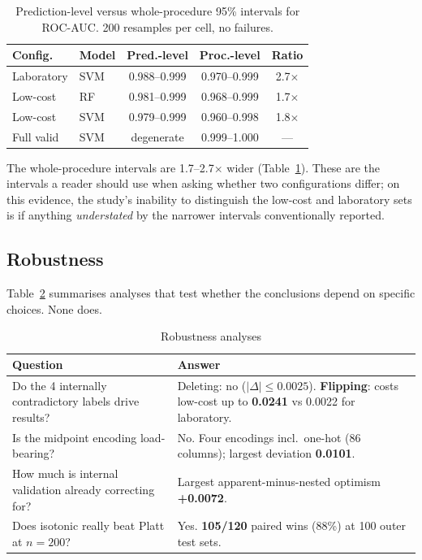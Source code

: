 \documentclass[conference]{IEEEtran}
\newcommand{\tabhead}[1]{\textbf{#1}}
\begin{document}
\begin{table}[t]
\caption{Prediction-level versus whole-procedure 95\% intervals for ROC-AUC.
200 resamples per cell, no failures.}
\label{tab:boot}
\centering
\footnotesize
\setlength{\tabcolsep}{3pt}
\begin{tabular}{llccc}
\toprule
\tabhead{Config.} & \tabhead{Model} & \tabhead{Pred.-level} &
\tabhead{Proc.-level} & \tabhead{Ratio} \\
\midrule
Laboratory & SVM & 0.988--0.999 & 0.970--0.999 & 2.7$\times$ \\
Low-cost   & RF  & 0.981--0.999 & 0.968--0.999 & 1.7$\times$ \\
Low-cost   & SVM & 0.979--0.999 & 0.960--0.998 & 1.8$\times$ \\
Full valid & SVM & degenerate   & 0.999--1.000 & --- \\
\bottomrule
\end{tabular}
\end{table}

The whole-procedure intervals are 1.7--2.7$\times$ wider (Table~\ref{tab:boot}). These
are the intervals a reader should use when asking whether two configurations
differ; on this evidence, the study's inability to distinguish the low-cost
and laboratory sets is if anything \emph{understated} by the narrower
intervals conventionally reported.

\subsection{Robustness}

Table~\ref{tab:robust} summarises analyses that test whether the conclusions
depend on specific choices. None does.

\begin{table}[t]
\caption{Robustness analyses}
\label{tab:robust}
\centering
\small
\begin{tabular}{p{4.4cm}p{3.1cm}}
\toprule
\tabhead{Question} & \tabhead{Answer} \\
\midrule
Do the 4 internally contradictory labels drive results? &
Deleting: no ($|\Delta| \leq 0.0025$). \textbf{Flipping}: costs low-cost up to
\textbf{0.0241} vs 0.0022 for laboratory. \\
Is the midpoint encoding load-bearing? &
No. Four encodings incl.\ one-hot (86 columns); largest deviation
\textbf{0.0101}. \\
How much is internal validation already correcting for? &
Largest apparent-minus-nested optimism \textbf{+0.0072}. \\
Does isotonic really beat Platt at $n=200$? &
Yes. \textbf{105/120} paired wins (88\%) at 100 outer test sets. \\
\bottomrule
\end{tabular}
\end{table}
\end{document}
